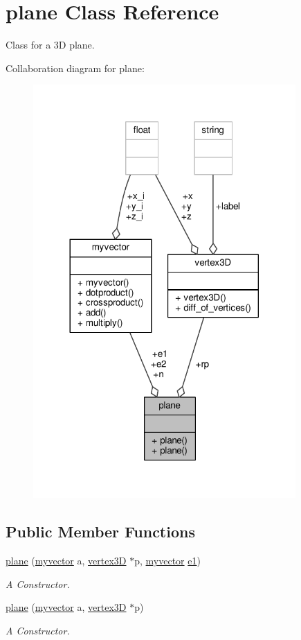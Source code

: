 \hypertarget{classplane}{}\section{plane Class Reference}
\label{classplane}


Class for a 3D plane.  




Collaboration diagram for plane\+:\nopagebreak
\begin{figure}[H]
\begin{center}
\leavevmode
\includegraphics[width=284pt]{classplane__coll__graph}
\end{center}
\end{figure}
\subsection*{Public Member Functions}
\begin{DoxyCompactItemize}
\item 
\hyperlink{classplane_ab506ee0963b2469308760cad533b2539}{plane} (\hyperlink{classmyvector}{myvector} a, \hyperlink{classvertex3D}{vertex3D} $\ast$p, \hyperlink{classmyvector}{myvector} \hyperlink{classplane_a8edd6c4f34e5caae715c1f08b9898830}{e1})
\begin{DoxyCompactList}\small\item\em A Constructor. \end{DoxyCompactList}\item 
\hyperlink{classplane_a3f20707cf6b495058c537235a80c2ab8}{plane} (\hyperlink{classmyvector}{myvector} a, \hyperlink{classvertex3D}{vertex3D} $\ast$p)
\begin{DoxyCompactList}\small\item\em A Constructor. \end{DoxyCompactList}\end{DoxyCompactItemize}
